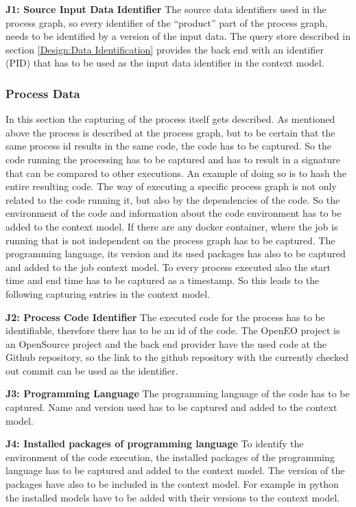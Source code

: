 \documentclass[draft,final]{vutinfth} %
\begin{document}
\textbf{J1:  Source Input Data Identifier}
The source data identifiers used in the process graph, so every identifier of the “product” part of the process graph, needs to be identified by a version of the input data. The query store described in section \ref{Design:Data Identification} provides the back end with an identifier (PID) that has to be used as the input data identifier in the context model.


\subsubsection{Process Data}\label{Job:Process Data}
In this section the capturing of the process itself gets described. As mentioned above the process is described at the process graph, but to be certain that the same process id results in the same code, the code has to be captured. So the code running the processing has to be captured and has to result in a signature that can be compared to other executions. An example of doing so is to hash the entire resulting code. 
The way of executing a specific process graph is not only related to the code running it, but also by the dependencies of the code. So the environment of the code and information about the code environment has to be added to the context model. If there are any docker container, where the job is running that is not independent on the process graph has to be captured. The programming language, its version and its used packages has also to be captured and added to the job context model. To every process executed also the start time and end time has to be captured as a timestamp. So this leads to the following capturing entries in the context model.

\textbf{J2: Process Code Identifier}
The executed  code for the process has to be identifiable, therefore there has to be an id of the code. The OpenEO project is an OpenSource project and the back end provider have the used code at the Github repository, so the link to the github repository with the currently checked out commit can be used as the identifier. 

\textbf{J3: Programming Language}
The programming language of the code has to be captured. Name and version used has to be captured and added to the context model.

\textbf{J4: Installed packages of programming language}
To identify the environment of the code execution, the installed packages of the programming language has to be captured and added to the context model. The version of the packages have also to be included in the context model. For example in python the installed models have to be added with their versions to the context model.
\end{document}
